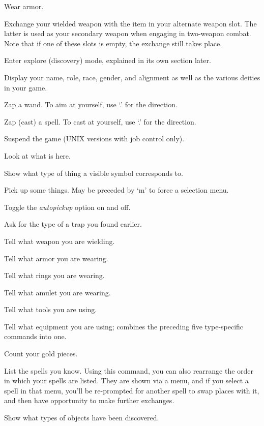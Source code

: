 Wear armor.
\item[\tb{x}]
Exchange your wielded weapon with the item in your alternate
weapon slot.  The latter is used as your secondary weapon when engaging in
two-weapon combat.  Note that if one of these slots is empty,
the exchange still takes place.
\item[\tb{X}]
Enter explore (discovery) mode, explained in its own section later.
\item[\tb{\^X}]
Display your name, role, race, gender, and alignment as well as
the various deities in your game.
\item[\tb{z}]
Zap a wand.  To aim at yourself, use `.' for the direction.
\item[\tb{Z}]
Zap (cast) a spell.  To cast at yourself, use `.' for the direction.
\item[\tb{\^Z}]
Suspend the game (UNIX versions with job control only).
\item[\tb{:}]
Look at what is here.
\item[\tb{;}]
Show what type of thing a visible symbol corresponds to.
\item[\tb{,}]
Pick up some things. May be preceded by `m' to force a selection menu.
\item[\tb{@}]
Toggle the
{\it autopickup }
option on and off.
\item[\tb{\^}]
Ask for the type of a trap you found earlier.
\item[\tb{)}]
Tell what weapon you are wielding.
\item[\tb{[}]
Tell what armor you are wearing.
\item[\tb{=}]
Tell what rings you are wearing.
\item[\tb{"}]
Tell what amulet you are wearing.
\item[\tb{(}]
Tell what tools you are using.
\item[\tb{*}]
Tell what equipment you are using; combines the preceding five type-specific
commands into one.
\item[\tb{\$}]
Count your gold pieces.
\item[\tb{+}]
List the spells you know.  Using this command, you can also rearrange
the order in which your spells are listed.  They are shown via a menu,
and if you select a spell in that menu, you'll be re-prompted for
another spell to swap places with it, and then have opportunity to
make further exchanges.
\item[\tb{$\backslash$}]
Show what types of objects have been discovered.
\item[\tb{!}]
